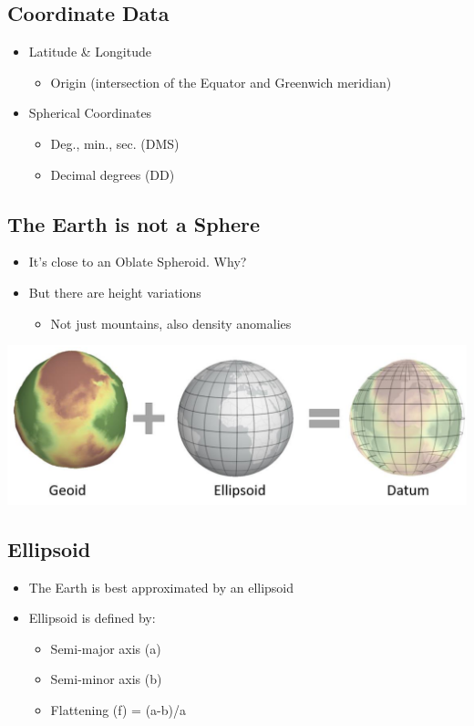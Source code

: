 \documentclass[11pt]{article}
\theoremstyle{definition}
\begin{document}
\subsection{Coordinate Data}
\begin{itemize}
    \item Latitude \& Longitude
    \begin{itemize}
        \item Origin (intersection of the
        Equator and Greenwich
        meridian)
    \end{itemize}
    \item Spherical Coordinates
    \begin{itemize}
        \item Deg., min., sec. (DMS)
        \item Decimal degrees (DD)
    \end{itemize}
\end{itemize}

\subsection{The Earth is not a Sphere}
\begin{itemize}
    \item It’s close to an Oblate Spheroid. Why?
    \item But there are height variations
    \begin{itemize}
        \item Not just mountains, also density anomalies
    \end{itemize}
\end{itemize}

\includegraphics[width=\textwidth/2]{7.png}

\subsection{Ellipsoid}
\begin{itemize}
    \item The Earth is best approximated by an ellipsoid
    \item Ellipsoid is defined by:
    \begin{itemize}
        \item Semi-major axis (a)
        \item Semi-minor axis (b)
        \item Flattening (f) = (a-b)/a
    \end{itemize}
\end{itemize}
\end{document}
